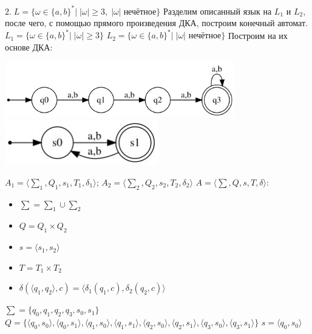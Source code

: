 \documentclass[a4paper,12pt]{article}
\begin{document}
\endgroup
\Large $2.\;L = {\{\omega \in \{a,b\}^*|\;|\omega| \ge 3,\;|\omega| \; \text{нечётное}\}}$\newline
Разделим описанный язык на $L_1$ и $L_2$, после чего, с помощью прямого произведения ДКА, построим конечный автомат.\newline
\Large $L_1 = {\{\omega \in \{a,b\}^*|\;|\omega| \ge 3\}}$\newline
\Large $L_2 = {\{\omega \in \{a,b\}^*|\;|\omega| \text{ нечётное} \}}$\newline
Построим на их основе ДКА:\newline
\begin{center}
\includegraphics[width=0.75\textwidth]{2_2_1}\newline
\includegraphics[width=0.5\textwidth]{2_2_2}\newline
\end{center}
$A_1 = {\langle\sum_1 , Q_1, s_1, T_1, \delta_1 \rangle}$;
$A_2 = {\langle\sum_2 , Q_2, s_2, T_2, \delta_2 \rangle}$\newline
$A = {\langle\sum , Q, s, T, \delta \rangle}$:
\begin{itemize}
\item $\sum = \sum_1 \cup \sum_2$
\item $Q = Q_1 \times Q_2$
\item $s = \langle s_1 , s_2\rangle$
\item $T = T_1 \times T_2$
\item $\delta(\langle q_1 , q_2\rangle, c) =  \langle \delta_1 (q_1 , c), \delta_2 (q_2, c) \rangle$
\end{itemize}
$\sum = \{q_0, q_1, q_2, q_3, s_0, s_1\}$\newline
\normalsize $Q = \{\langle q_0 , s_0 \rangle ,\langle q_0 , s_1 \rangle ,\langle q_1 , s_0 \rangle , \langle q_1 , s_1 \rangle , \langle q_2 , s_0 \rangle , \langle q_2 , s_1 \rangle , \langle q_3 , s_0 \rangle , \langle q_3 , s_1 \rangle\}$\newline
\Large $s = \langle q_0 , s_0 \rangle$\newline
\end{document}
